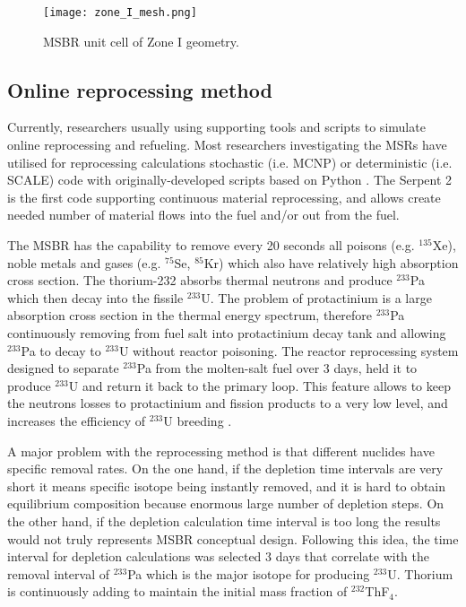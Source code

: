 \documentclass{anstrans}
\begin{document}
\begin{figure}[h] %
        \centering
        \vspace{-0.6em}
        \texttt{[image: zone\_I\_mesh.png]}
        \caption{MSBR unit cell of Zone I geometry.}
        \label{fig:zoneI}
\end{figure}

\subsection{Online reprocessing method}

Currently, researchers usually using supporting tools and scripts to simulate 
online reprocessing and refueling. Most researchers investigating the 
\gls{MSR}s have utilised for reprocessing calculations stochastic (i.e. 
\gls{MCNP}) or deterministic (i.e. SCALE) code with originally-developed 
scripts based on Python \cite{jeong_equilibrium_2016,park_whole_2015}. The 
Serpent 2 is the first code supporting continuous material reprocessing, and 
allows create needed number of material flows into the fuel and/or out from the 
fuel.

The \gls{MSBR} has the capability to remove every 20 seconds all poisons (e.g. 
$^{135}$Xe), noble metals and gases (e.g. $^{75}$Se, $^{85}$Kr) which also have 
relatively high absorption cross section. The thorium-232 absorbs thermal 
neutrons and produce $^{233}$Pa which then decay into the fissile $^{233}$U. 
The problem of protactinium is a large absorption cross section in the thermal 
energy spectrum, therefore $^{233}$Pa continuously removing from fuel salt into 
protactinium decay tank and allowing $^{233}$Pa to decay to $^{233}$U without 
reactor poisoning. The reactor reprocessing system designed to separate 
$^{233}$Pa from the molten-salt fuel over 3 days, held it to produce $^{233}$U 
and return it back to the primary loop. This feature allows to keep the 
neutrons losses to protactinium and fission products to a very low level, and 
increases the efficiency of $^{233}$U breeding \cite{robertson_conceptual_1971}.

A major problem with the reprocessing method is that different nuclides have 
specific removal rates. On the one hand, if the depletion time intervals are 
very short it means specific isotope being instantly removed, and it is hard to 
obtain equilibrium composition because enormous large number of depletion 
steps. On the other hand, if the depletion calculation time interval is too 
long the results would not truly represents \gls{MSBR} conceptual design. 
Following this idea, the time interval for depletion calculations was selected 
3 days that correlate with the removal interval of $^{233}$Pa which is the 
major isotope for producing $^{233}$U. Thorium is continuously adding to 
maintain the initial mass fraction of $^{232}$ThF$_4$.
\end{document}
